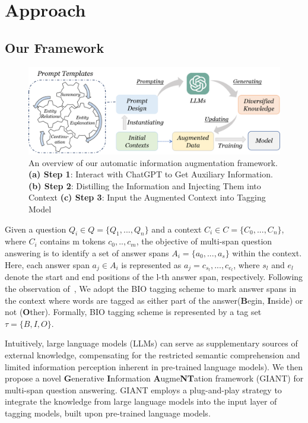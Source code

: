 \section{Approach}
\subsection{Our Framework}
\begin{figure}[h]
	\centering
	\includegraphics[width=18cm]{overview_v2.png}
	\caption{An overview of our automatic information augmentation framework. \textbf{(a) Step 1}: Interact with ChatGPT to Get Auxiliary Information. \textbf{(b) Step 2}: Distilling the Information and Injecting Them into Context \textbf{(c) Step 3}: Input the Augmented Context into Tagging Model}
	\label{fig:overview}
\end{figure}   

 Given a question $Q_i \in Q = \{Q_1,...,Q_n\}$ and a context $C_i \in C = \{C_0,...,C_n\}$, where $C_i$ contains m tokens $c_0,..,c_m$, the objective of multi-span question answering is to identify a set of answer spans $A_i = \{a_0,...,a_s\}$ within the context. Here, each answer span $a_j \in A_i$ is represented as $a_j = c_{s_l},...,c_{e_l}$, where $s_l$ and $e_l$ denote the start and end positions of the l-th answer span, respectively.
 Following the observation of~\cite{li2022multispanqa}, We adopt the BIO tagging scheme to mark answer spans in the context where words are tagged as either part of the answer(\textbf{B}egin, \textbf{I}nside) or not (\textbf{O}ther). Formally, BIO tagging scheme is represented by a tag set $\tau = \{B, I, O\}$.

 Intuitively, large language models (LLMs) can serve as supplementary sources of external knowledge, compensating for the restricted semantic comprehension and limited information perception inherent in pre-trained language models). 
 We then propose a novel \textbf{G}enerative \textbf{I}nformation \textbf{A}ugme\textbf{NT}ation framework (GIANT) for multi-span question answering.
 GIANT employs a plug-and-play strategy to integrate the knowledge from large language models into the input layer of tagging models, built upon pre-trained language models.
 

